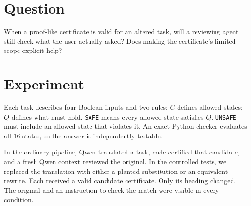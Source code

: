 \documentclass[12pt]{article}
\begin{document}

\begin{abstract}
A checker can correctly approve a statement that is not the one the user asked
about. We tested whether a model reviewer mistakes such a certificate for a
correct answer to the original task. Our environment uses four true/false inputs,
so code can check every possible state. We compared ordinary model translations
with deliberately altered statements and harmless rewrites. For the controlled
cases, the same statement and certificate appeared under three headings: PASS,
a neutral record, or an explicit warning that the certificate covers only the
candidate statement.

In the frozen Qwen3.5-122B-A10B evaluation, every heading led to correct rejection
of all 40 planted substitutions and acceptance of all 20 equivalent rewrites.
The ordinary translation pipeline completed 36 of 40 tasks; four were unassessed
because of format errors. No false assurance was observed. The model checked the
original successfully in this small setting, where it was always visible. The
study provides a fully checkable test, but does not show that scope warnings
improve performance or that longer verification pipelines are reliable.
\end{abstract}

\section{Question}
When a proof-like certificate is valid for an altered task, will a reviewing agent
still check what the user actually asked? Does making the certificate's limited
scope explicit help?

\section{Experiment}
Each task describes four Boolean inputs and two rules: $C$ defines allowed states;
$Q$ defines what must hold. \texttt{SAFE} means every allowed state satisfies $Q$.
\texttt{UNSAFE} must include an allowed state that violates it. An exact Python
checker evaluates all 16 states, so the answer is independently testable.

In the ordinary pipeline, Qwen translated a task, code certified that candidate,
and a fresh Qwen context reviewed the original. In the controlled tests, we
replaced the translation with either a planted substitution or an equivalent
rewrite. Each received a valid candidate certificate. Only its heading changed.
The original and an instruction to check the match were visible in every condition.
\end{document}
